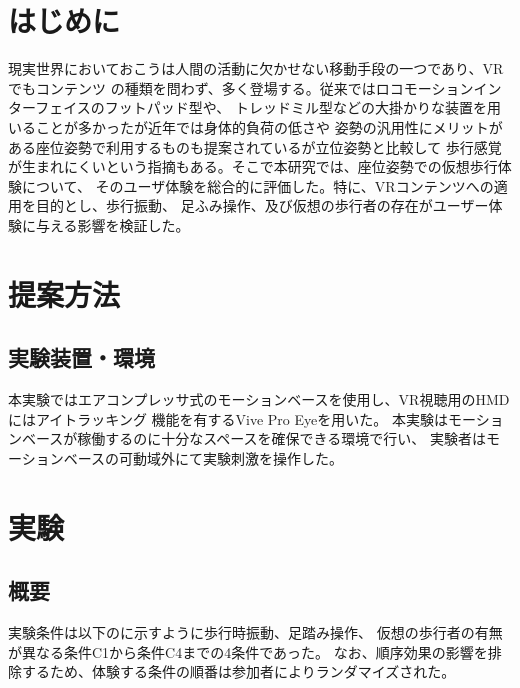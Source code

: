 \documentclass[uplatex]{jsarticle}   %
\begin{document}

\vspace{3mm}

\setcounter{page}{x}



\section{はじめに}
現実世界においておこうは人間の活動に欠かせない移動手段の一つであり、VRでもコンテンツ
の種類を問わず、多く登場する。従来ではロコモーションインターフェイスのフットパッド型や、
トレッドミル型などの大掛かりな装置を用いることが多かったが近年では身体的負荷の低さや
姿勢の汎用性にメリットがある座位姿勢で利用するものも提案されているが立位姿勢と比較して
歩行感覚が生まれにくいという指摘もある。そこで本研究では、座位姿勢での仮想歩行体験について、
そのユーザ体験を総合的に評価した。特に、VRコンテンツへの適用を目的とし、歩行振動、
足ふみ操作、及び仮想の歩行者の存在がユーザー体験に与える影響を検証した。

\section{提案方法}
\subsection{実験装置・環境}
本実験ではエアコンプレッサ式のモーションベースを使用し、VR視聴用のHMDにはアイトラッキング
機能を有するVive Pro Eyeを用いた。
本実験はモーションベースが稼働するのに十分なスペースを確保できる環境で行い、
実験者はモーションベースの可動域外にて実験刺激を操作した。

\section{実験}
\subsection{概要}
実験条件は以下のに示すように歩行時振動、足踏み操作、
仮想の歩行者の有無が異なる条件C1から条件C4までの4条件であった。
なお、順序効果の影響を排除するため、体験する条件の順番は参加者によりランダマイズされた。




\end{document}
